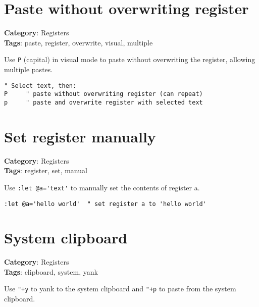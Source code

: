 {{{{{{{{{{{\section{Paste without overwriting register}

\textbf{Category}: Registers\\ \textbf{Tags}: paste, register, overwrite, visual, multiple
\vspace{0.5cm}

Use {\footnotesize \Verb§P§} (capital) in visual mode to paste without overwriting the register, allowing multiple pastes.

\begin{Exa*}{}
\begin{Verbatim}[fontsize=\footnotesize, breaklines, breakanywhere]
" Select text, then:
P     " paste without overwriting register (can repeat)
p     " paste and overwrite register with selected text
\end{Verbatim}
\end{Exa*}

\section{Set register manually}

\textbf{Category}: Registers\\ \textbf{Tags}: register, set, manual
\vspace{0.5cm}

Use {\footnotesize \Verb§:let @a='text'§} to manually set the contents of register a.

\begin{Exa*}{}
\begin{Verbatim}[fontsize=\footnotesize, breaklines, breakanywhere]
:let @a='hello world'  " set register a to 'hello world'
\end{Verbatim}
\end{Exa*}

\section{System clipboard}

\textbf{Category}: Registers\\ \textbf{Tags}: clipboard, system, yank
\vspace{0.5cm}

Use {\footnotesize \Verb§"+y§} to yank to the system clipboard and {\footnotesize \Verb§"+p§} to paste from the system clipboard.

}}}}}}}}}}}
